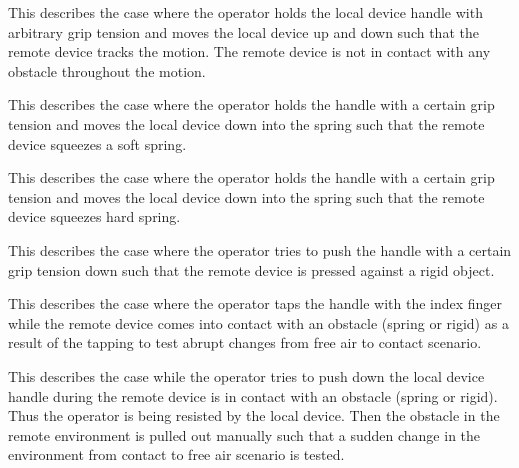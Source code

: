 \begin{description}[leftmargin=!,labelwidth=3.5cm]
  \item[Free air] This describes the case where the operator holds the local device handle with arbitrary grip tension and moves the local 
                  device up and down such that the remote device tracks the motion. The remote device is not in contact with any obstacle
                  throughout the motion. 
  \item[Soft Spring Contact ] This describes the case where the operator holds the handle with a certain grip tension and moves the local 
                              device down into the spring such that the remote device squeezes a soft spring.
  \item[Hard Spring Contact] This describes the case where the operator holds the handle with a certain grip tension and moves the local 
                              device down into the spring such that the remote device squeezes hard spring.
  \item[Rigid Contact] This describes the case where the operator tries to push the handle with a certain grip tension down 
                       such that the remote device is pressed against a rigid object.
  \item[Contact Tapping] This describes the case where the operator taps the handle with the index finger while the remote device 
                         comes into contact with an obstacle (spring or rigid) as a result of the tapping to test abrupt changes 
                         from free air to contact scenario.
  \item[Contact Slide] This describes the case while the operator tries to push down the local device handle during the remote device
                       is in contact with an obstacle (spring or rigid). Thus the operator is being resisted by the local device. Then
                       the obstacle in the remote environment is pulled out manually such that a sudden change in the environment from
                       contact to free air scenario is tested.
\end{description}

